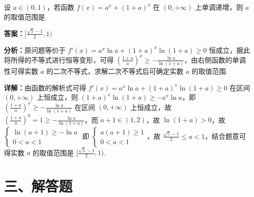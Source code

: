 \begin{question}[points=5]
设 $a\in(0,1)$，若函数 $f(x)=a^x+(1+a)^x$ 在 $(0,+\infty)$ 上单调递增，则 $a$ 的取值范围是.
\fillin[{$[\frac{\sqrt{5}-1}{2},1)$}]
\begin{solution}
\textbf{答案：}$[\frac{\sqrt{5}-1}{2},1)$

\textbf{分析：}原问题等价于 $f'(x)=a^x\ln a+(1+a)^x\ln(1+a)\ge 0$ 恒成立，据此将所得的不等式进行恒等变形，可得 $(\frac{1+a}{a})^x\ge -\frac{\ln a}{\ln(1+a)}$，由右侧函数的单调性可得实数 $a$ 的二次不等式，求解二次不等式后可确定实数 $a$ 的取值范围.

\textbf{详解：}由函数的解析式可得 $f'(x)=a^x\ln a+(1+a)^x\ln(1+a)\ge 0$ 在区间 $(0,+\infty)$ 上恒成立，则 $(1+a)^x\ln(1+a)\ge -a^x\ln a$，即 $(\frac{1+a}{a})^x\ge -\frac{\ln a}{\ln(1+a)}$ 在区间 $(0,+\infty)$ 上恒成立，故 $(\frac{1+a}{a})^0=1\ge -\frac{\ln a}{\ln(1+a)}$，而 $a+1\in(1,2)$，故 $\ln(1+a)>0$，故 $\begin{cases} \ln(a+1)\ge -\ln a \\ 0<a<1 \end{cases}$ 即 $\begin{cases} a(a+1)\ge 1 \\ 0<a<1 \end{cases}$，故 $\frac{\sqrt{5}-1}{2}\le a<1$，结合题意可得实数 $a$ 的取值范围是 $[\frac{\sqrt{5}-1}{2},1)$.
\end{solution}
\end{question}

\section*{三、解答题}

